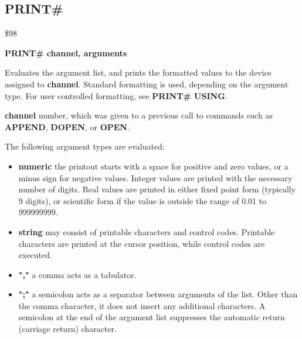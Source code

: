 
\newpage
\subsection{PRINT\#}
\begin{description}[leftmargin=2cm,style=nextline]
\item [Token:] \$98
\item [Format:] {\bf PRINT\# channel, arguments}
\item [Usage:]  Evaluates the argument list, and prints the formatted
                values to the device assigned to {\bf channel}.
                Standard formatting is used, depending on the
                argument type. For user controlled formatting,
                see {\bf PRINT\# USING}.

                {\bf channel} number, which was given to a previous
                call to commands such as {\bf APPEND}, {\bf DOPEN}, or {\bf OPEN}.

                The following argument types are evaluated:
                \begin{itemize}
                    \item {\bf numeric} the printout starts with a space
                    for positive and zero values, or a minus sign for
                    negative values. Integer values are printed with
                    the necessary number of digits. Real values are
                    printed in either fixed point form (typically
                    9 digits), or scientific form if the value is
                    outside the range of 0.01 to 999999999.

                    \item {\bf string} may consist of printable
                    characters and control codes. Printable characters
                    are printed at the cursor position, while control
                    codes are executed.

                    \item {\bf ","} a comma acts as a tabulator.

                    \item {\bf ";"} a semicolon acts as a separator between
                    arguments of the list. Other than the comma character,
                    it does not insert any additional characters.
                    A semicolon at the end of the argument list suppresses
                    the automatic return (carriage return) character.
                \end{itemize}


\end{description}
